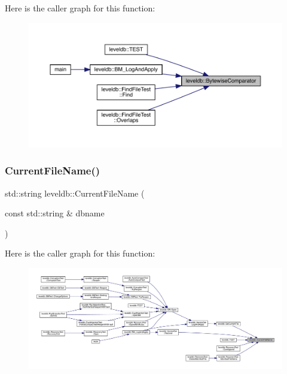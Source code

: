 Here is the caller graph for this function\+:
\nopagebreak
\begin{figure}[H]
\begin{center}
\leavevmode
\includegraphics[width=350pt]{namespaceleveldb_aaefedd89ff6910738cb4c8e629087b93_icgraph}
\end{center}
\end{figure}
\mbox{\label{namespaceleveldb_affcb2d434f2a772d7c764cd5d1797a9a}} 
\subsubsection{\texorpdfstring{CurrentFileName()}{CurrentFileName()}}
{\footnotesize\ttfamily std\+::string leveldb\+::\+Current\+File\+Name (\begin{DoxyParamCaption}\item[{const std\+::string \&}]{dbname }\end{DoxyParamCaption})}

Here is the caller graph for this function\+:
\nopagebreak
\begin{figure}[H]
\begin{center}
\leavevmode
\includegraphics[width=350pt]{namespaceleveldb_affcb2d434f2a772d7c764cd5d1797a9a_icgraph}
\end{center}
\end{figure}
\mbox{\label{namespaceleveldb_a1ea160b70b18dc85b537e16db3d6ddd0}} 
